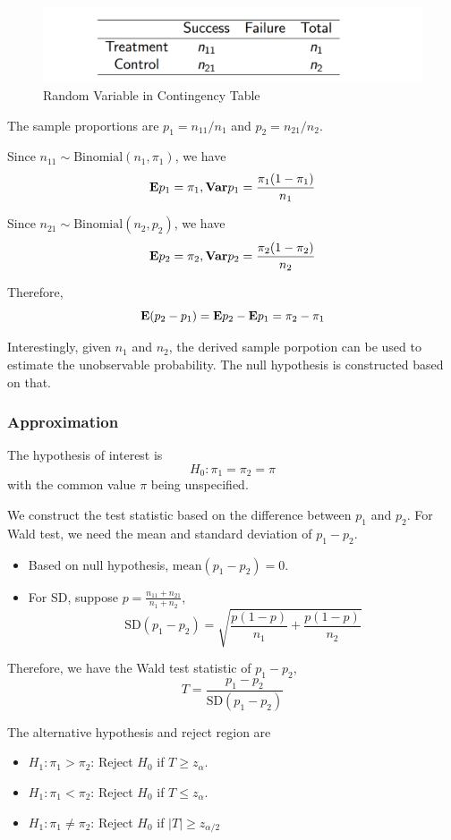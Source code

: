 \begin{figure}[H]
	\centering
	\includegraphics[width=0.7\linewidth]{fig/2x2-table1}
	\caption{Random Variable in Contingency Table}
	\label{fig:2x2-table1}
\end{figure}

The sample proportions are $p_1 = n_{11}/ n_1$ and $p_2 = n_{21} / n_2$.

Since $n_{11} \sim \text{Binomial}(n_1, \pi_1)$, we have
\[{\mathbf E} p_1 = \pi_1, {\mathbf{Var}} p_1 = \frac{\pi_1 (1 - \pi_1)}{n_1}\]

Since $n_{21} \sim \text{Binomial}(n_2, p_2)$, we have
\[{\mathbf E} p_2 = \pi_2, {\mathbf{Var}} p_2 = \frac{\pi_2 (1 - \pi_2)}{n_2}\]

Therefore,
\[{\mathbf E}(p_2 - p_1) = {\mathbf E} p_2 - {\mathbf E} p_1 = \pi_2 - \pi_1\] 

Interestingly, given $n_1$ and $n_2$, the derived sample porpotion can be used to estimate the unobservable probability. The null hypothesis is constructed based on that.

\subsubsection{Approximation}
The hypothesis of interest is 
\[H_0: \pi_1 = \pi_2 = \pi\]
with the common value $\pi$ being unspecified.

We construct the test statistic based on the difference between $p_1$ and $p_2$. For Wald test, we need the mean and standard deviation of $p_1 - p_2$.
\begin{itemize}
	\item Based on null hypothesis, $\text{mean}(p_1 - p_2) = 0$.
	\item For SD, suppose $p = \frac{n_{11} + n_{21}}{n_1 + n_2}$,
	\[\text{SD}(p_1 - p_2) = \sqrt{\frac{p(1-p)}{n_1} + \frac{p(1-p)}{n_2}}\]
\end{itemize}

Therefore, we have the Wald test statistic of $p_1 - p_2$,
\[T = \frac{p_1 - p_2}{\text{SD}(p_1 - p_2)}\]

The alternative hypothesis and reject region are 
\begin{itemize}
	\item $H_1: \pi_1 > \pi_2$: Reject $H_0$ if $T \ge z_\alpha$.
	\item $H_1: \pi_1 < \pi_2$: Reject $H_0$ if $T \le z_\alpha$.
	\item $H_1: \pi_1 \neq \pi_2$: Reject $H_0$ if $|T| \ge z_{\alpha/2}$
\end{itemize}


